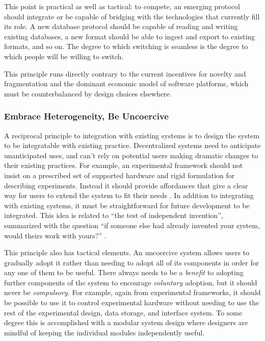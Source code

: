 \documentclass[10pt]{article}
\begin{document}
\begin{multicols}{2}
This point is practical as well as tactical: to compete, an emerging
protocol should integrate or be capable of bridging with the
technologies that currently fill its role. A new database protocol
should be capable of reading and writing existing databases, a new
format should be able to ingest and export to existing formats, and so
on. The degree to which switching is seamless is the degree to which
people will be willing to switch.

This principle runs directly contrary to the current incentives for
novelty and fragmentation and the dominant economic model of software
platforms, which must be counterbalanced by design choices elsewhere.

\hypertarget{embrace-heterogeneity-be-uncoercive}{%
\subsubsection{Embrace Heterogeneity, Be
Uncoercive}\label{embrace-heterogeneity-be-uncoercive}}

A reciprocal principle to integration with existing systems is to design
the system to be integratable with existing practice. Decentralized
systems need to anticipate unanticipated uses, and can't rely on
potential users making dramatic changes to their existing practices. For
example, an experimental framework should not insist on a prescribed set
of supported hardware and rigid formulation for describing experiments.
Instead it should provide affordances that give a clear way for users to
extend the system to fit their needs \cite{carpenterRFC1958Architectural1996} . In addition to integrating with
existing systems, it must be straightforward for future development to
be integrated. This idea is related to ``the test of independent
invention'', summarized with the question ``if someone else had already
invented your system, would theirs work with yours?'' \cite{berners-leePrinciplesDesign1998} .

This principle also has tactical elements. An uncoercive system allows
users to gradually adopt it rather than needing to adopt all of its
components in order for any one of them to be useful. There always needs
to be a \emph{benefit} to adopting further components of the system to
encourage \emph{voluntary} adoption, but it should never be
\emph{compulsory.} For example, again from experimental frameworks, it
should be possible to use it to control experimental hardware without
needing to use the rest of the experimental design, data storage, and
interface system. To some degree this is accomplished with a modular
system design where designers are mindful of keeping the individual
modules independently useful.


\end{multicols}
\end{document}
